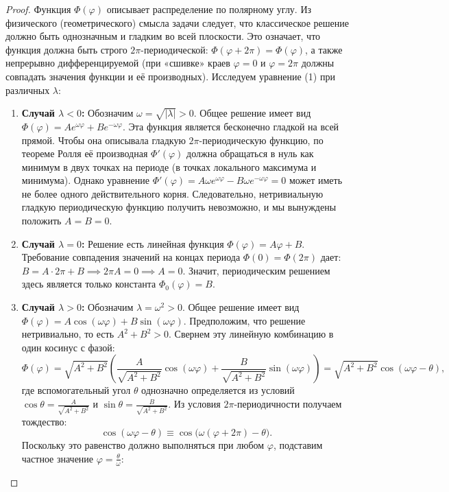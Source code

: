 \documentclass[a4paper,10pt]{article}
\begin{document}
\begin{proof}
Функция $\Phi(\varphi)$ описывает распределение по полярному углу. Из физического (геометрического) смысла задачи следует, что классическое решение должно быть однозначным и гладким во всей плоскости. Это означает, что функция должна быть строго $2\pi$-периодической: $\Phi(\varphi + 2\pi) = \Phi(\varphi)$, а также непрерывно дифференцируемой (при «сшивке» краев $\varphi=0$ и $\varphi=2\pi$ должны совпадать значения функции и её производных).
Исследуем уравнение (1) при различных $\lambda$:
\begin{enumerate}
    \item \textbf{Случай $\lambda < 0$:} Обозначим $\omega = \sqrt{|\lambda|} > 0$. Общее решение имеет вид $\Phi(\varphi) = A e^{\omega \varphi} + B e^{-\omega \varphi}$. Эта функция является бесконечно гладкой на всей прямой. Чтобы она описывала гладкую $2\pi$-периодическую функцию, по теореме Ролля её производная $\Phi'(\varphi)$ должна обращаться в нуль как минимум в двух точках на периоде (в точках локального максимума и минимума). Однако уравнение $\Phi'(\varphi) = A\omega e^{\omega \varphi} - B\omega e^{-\omega \varphi} = 0$ может иметь не более одного действительного корня. Следовательно, нетривиальную гладкую периодическую функцию получить невозможно, и мы вынуждены положить $A = B = 0$.
    \item \textbf{Случай $\lambda = 0$:} Решение есть линейная функция $\Phi(\varphi) = A\varphi + B$. Требование совпадения значений на концах периода $\Phi(0) = \Phi(2\pi)$ дает: $B = A \cdot 2\pi + B \implies 2\pi A = 0 \implies A = 0$. Значит, периодическим решением здесь является только константа $\Phi_0(\varphi) = B$.
    \item \textbf{Случай $\lambda > 0$:} Обозначим $\lambda = \omega^2 > 0$. Общее решение имеет вид $\Phi(\varphi) = A \cos(\omega \varphi) + B \sin(\omega \varphi)$. Предположим, что решение нетривиально, то есть $A^2 + B^2 > 0$. Свернем эту линейную комбинацию в один косинус с фазой:
    \[ \Phi(\varphi) = \sqrt{A^2 + B^2} \left( \frac{A}{\sqrt{A^2 + B^2}} \cos(\omega\varphi) + \frac{B}{\sqrt{A^2 + B^2}} \sin(\omega\varphi) \right) = \sqrt{A^2 + B^2} \cos(\omega\varphi - \theta), \]
    где вспомогательный угол $\theta$ однозначно определяется из условий $\cos\theta = \frac{A}{\sqrt{A^2+B^2}}$ и $\sin\theta = \frac{B}{\sqrt{A^2+B^2}}$.
    Из условия $2\pi$-периодичности получаем тождество:
    \[ \cos(\omega\varphi - \theta) \equiv \cos\big(\omega(\varphi + 2\pi) - \theta\big). \]
    Поскольку это равенство должно выполняться при любом $\varphi$, подставим частное значение $\varphi = \frac{\theta}{\omega}$:

\end{enumerate}
\end{proof}
\end{document}

